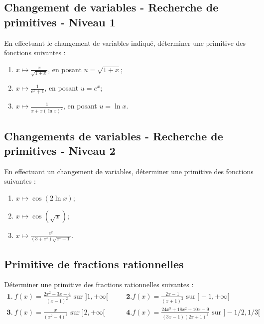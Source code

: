 

\vspace{1em}
\subsection{Changement de variables - Recherche de primitives - Niveau 1}

En effectuant le changement de variables indiqué, déterminer une primitive des fonctions suivantes :
\begin{enumerate}
\item $\displaystyle x\mapsto \frac{x}{\sqrt{1+x}}$, en posant $u=\sqrt{1+x}$;
\item $\displaystyle x\mapsto \frac{1}{e^x+1}$, en posant $u=e^x$;
\item $\displaystyle x\mapsto \frac{1}{x+x(\ln x)^2}$, en posant $u=\ln x$.
\end{enumerate}




\vspace{1em}
\subsection{Changements de variables - Recherche de primitives - Niveau 2}

En effectuant un changement de variables, déterminer une primitive des fonctions suivantes :
\begin{enumerate}
\item $\displaystyle x\mapsto \cos(2\ln x)$;
\item $\displaystyle x\mapsto\cos(\sqrt x)$;
\item $\displaystyle x\mapsto \frac{e^x}{(3+e^x)\sqrt{e^x-1}}$.
\end{enumerate}




\vspace{1em}
\subsection{Primitive de fractions rationnelles}

Déterminer une primitive des fractions rationnelles suivantes :
$$
\begin{array}{lll}
\mathbf 1.\ f(x)=\frac{2x^2-3x+4}{(x-1)^2}\textrm{ sur }]1,+\infty[&\quad&\mathbf 2. f(x)=\frac{2x-1}{(x+1)^2}\textrm{ sur }]-1,+\infty[ \\
\mathbf 3.\ f(x)=\frac{x}{(x^2-4)^2}\textrm{ sur }]2,+\infty[&&\mathbf 4. f(x)=\frac{24x^3+18x^2+10x-9}{(3x-1)(2x+1)^2}\textrm{ sur }]-1/2,1/3[
\end{array}
$$


